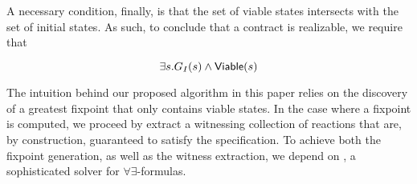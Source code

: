 A necessary condition, finally, is that the set of viable states
intersects with the set of initial states. As such, to conclude that a contract
is realizable, we require that

\begin{equation}
\exists s. G_I(s) \land {\mathsf {Viable}}(s)
\label{eq:nonempty}
\end{equation}

The intuition behind our proposed algorithm in this paper relies on the
discovery of a greatest fixpoint that only contains viable states. In the case where a fixpoint is computed, we proceed by extract a witnessing collection of reactions that are, by construction, guaranteed to satisfy the specification. To achieve both the fixpoint generation, as well as the witness extraction, we depend on \aeval, a sophisticated solver for $\forall\exists$-formulas.


